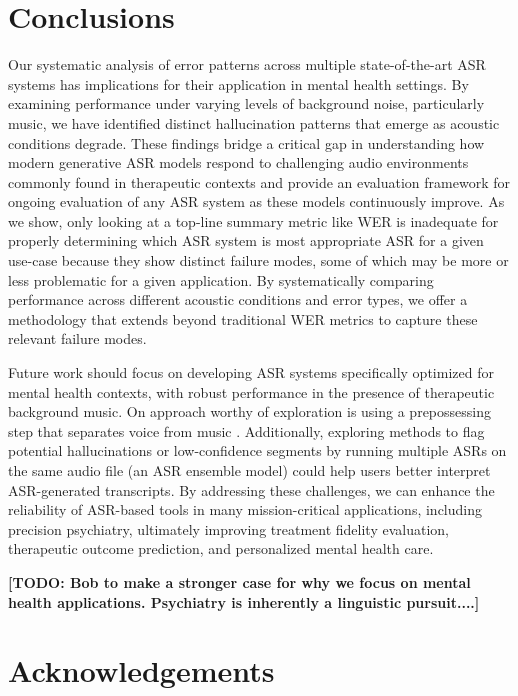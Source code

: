 \documentclass{article}
\begin{document}
\section{Conclusions} 

Our systematic analysis of error patterns across multiple state-of-the-art ASR systems has implications for their application in mental health settings. By examining performance under varying levels of background noise, particularly music, we have identified distinct hallucination patterns that emerge as acoustic conditions degrade. These findings bridge a critical gap in understanding how modern generative ASR models respond to challenging audio environments commonly found in therapeutic contexts and provide an evaluation framework for ongoing evaluation of any ASR system as these models continuously improve. As we show, only looking at a top-line summary metric like WER is inadequate for properly determining which ASR system is most appropriate ASR for a given use-case because they show distinct failure modes, some of which may be more or less problematic for a given application. By systematically comparing performance across different acoustic conditions and error types, we offer a methodology that extends beyond traditional WER metrics to capture these relevant failure modes.

Future work should focus on developing ASR systems specifically optimized for mental health contexts, with robust performance in the presence of therapeutic background music. On approach worthy of exploration is using a prepossessing step that separates voice from music \cite{???}. Additionally, exploring methods to flag potential hallucinations or low-confidence segments by running multiple ASRs on the same audio file (an ASR ensemble model) could help users better interpret ASR-generated transcripts. By addressing these challenges, we can enhance the reliability of ASR-based tools in many mission-critical applications, including precision psychiatry, ultimately improving treatment fidelity evaluation, therapeutic outcome prediction, and personalized mental health care.

\textbf{[TODO: Bob to make a stronger case for why we focus on mental health applications. Psychiatry is inherently a linguistic pursuit....]}

\section{Acknowledgements}
\end{document}

